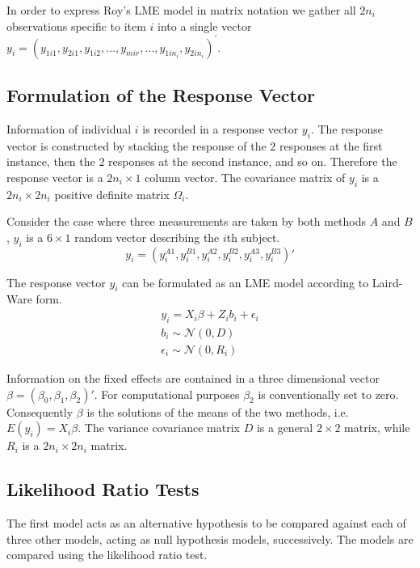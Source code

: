 \documentclass[12pt, a4paper]{report}
\theoremstyle{plain}
\theoremstyle{definition}
\theoremstyle{remark}
\begin{document}
In order to express Roy's LME model in matrix notation we gather all $2n_i$ observations specific to item $i$ into a single vector  ${y}_{i} = (y_{1i1},y_{2i1},y_{1i2},\ldots,y_{mir},\ldots,y_{1in_{i}},y_{2in_{i}})^\prime.$ 

\subsection{Formulation of the Response Vector}
Information of individual $i$ is recorded in a response vector ${y}_{i}$. The response vector is constructed by stacking the response of the $2$ responses at the first instance, then the $2$ responses at the second instance, and so on. Therefore the response vector is a $2n_{i} \times 1$ column vector.
The covariance matrix of ${y_{i}}$ is a $2n_{i} \times 2n_{i}$ positive definite matrix ${\Omega}_{i}$.

Consider the case where three measurements are taken by both methods $A$ and $B$, ${y}_{i}$ is a $6 \times 1$ random vector describing the $i$th subject.
\[
{y}_{i} = (y_{i}^{A1},y_{i}^{B1},y_{i}^{A2},y_{i}^{B2},y_{i}^{A3},y_{i}^{B3}) \prime
\]

The response vector ${y_{i}}$ can be formulated as an LME model according to Laird-Ware form.
\begin{eqnarray*}
{y_{i}} = {X_{i}\beta}  + {Z_{i}b_{i}} + {\epsilon_{i}}\\
{b_{i}} \sim \mathcal{N}({0,D})\\
{\epsilon_{i}} \sim \mathcal{N}({0,R_{i}})
\end{eqnarray*}

Information on the fixed effects are contained in a three dimensional vector ${\beta} = (\beta_{0},\beta_{1},\beta_{2})\prime$. For computational purposes $\beta_{2}$ is conventionally set to zero. Consequently ${\beta}$ is the solutions of the means of the two methods, i.e. $E({y}_{i})  = {X}_{i}{\beta}$. The variance covariance matrix ${D}$ is a general $2 \times 2$ matrix, while ${R}_{i}$ is a $2n_{i} \times 2n_{i}$ matrix.


\subsection{Likelihood Ratio Tests}
The first model acts as an alternative hypothesis to be compared against each of three other models, acting as null hypothesis models, successively. The models are compared using the likelihood ratio test. 
\end{document}
